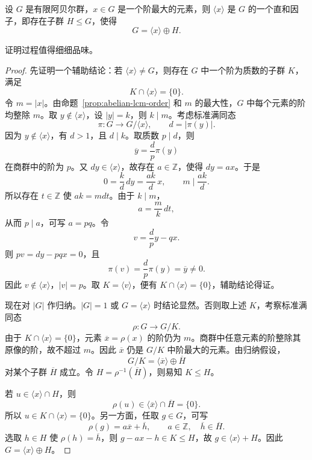 \begin{theorem}\label{thm:maximal-order-element-direct-summand}
设 $G$ 是有限阿贝尔群，$x\in G$ 是一个阶最大的元素，则 $\langle x\rangle$ 是 $G$ 的一个直和因子，即存在子群 $H\leq G$，使得
\[
  G=\langle x\rangle\oplus H.
\]
\end{theorem}

\begin{purplenote}
证明过程值得细细品味。
\end{purplenote}

\begin{proof}
先证明一个辅助结论：若 $\langle x\rangle\ne G$，则存在 $G$ 中一个阶为质数的子群 $K$，满足
\[
  K\cap\langle x\rangle=\{0\}.
\]
令 $m=|x|$。由命题~\ref{prop:abelian-lcm-order} 和 $m$ 的最大性，$G$ 中每个元素的阶均整除 $m$。取 $y\notin\langle x\rangle$，设 $|y|=k$，则 $k\mid m$。考虑标准满同态
\[
  \pi:G\longrightarrow G/\langle x\rangle,
  \qquad d=|\pi(y)|.
\]
因为 $y\notin\langle x\rangle$，有 $d>1$，且 $d\mid k$。取质数 $p\mid d$，则
\[
  \overline y=\frac{d}{p}\pi(y)
\]
在商群中的阶为 $p$。又 $dy\in\langle x\rangle$，故存在 $a\in\mathbb Z$，使得 $dy=ax$。于是
\[
  0=\frac{k}{d}\,dy=\frac{ak}{d}\,x,
  \qquad m\mid\frac{ak}{d}.
\]
所以存在 $t\in\mathbb Z$ 使 $ak=mdt$。由于 $k\mid m$，
\[
  a=\frac{m}{k}\,dt,
\]
从而 $p\mid a$，可写 $a=pq$。令
\[
  v=\frac{d}{p}y-qx.
\]
则 $pv=dy-pqx=0$，且
\[
  \pi(v)=\frac{d}{p}\pi(y)=\overline y\ne0.
\]
因此 $v\notin\langle x\rangle$，$|v|=p$。取 $K=\langle v\rangle$，便有 $K\cap\langle x\rangle=\{0\}$，辅助结论得证。

现在对 $|G|$ 作归纳。$|G|=1$ 或 $G=\langle x\rangle$ 时结论显然。否则取上述 $K$，考察标准满同态
\[
  \rho:G\longrightarrow G/K.
\]
由于 $K\cap\langle x\rangle=\{0\}$，元素 $\overline x=\rho(x)$ 的阶仍为 $m$。商群中任意元素的阶整除其原像的阶，故不超过 $m$。因此 $\overline x$ 仍是 $G/K$ 中阶最大的元素。由归纳假设，
\[
  G/K=\langle\overline x\rangle\oplus\overline H
\]
对某个子群 $\overline H$ 成立。令 $H=\rho^{-1}(\overline H)$，则易知 $K\leq H$。

若 $u\in\langle x\rangle\cap H$，则
\[
  \rho(u)\in\langle\overline x\rangle\cap\overline H=\{0\}.
\]
所以 $u\in K\cap\langle x\rangle=\{0\}$。另一方面，任取 $g\in G$，可写
\[
  \rho(g)=a\overline x+\overline h,
  \qquad a\in\mathbb Z,\quad\overline h\in\overline H.
\]
选取 $h\in H$ 使 $\rho(h)=\overline h$，则 $g-ax-h\in K\leq H$，故 $g\in\langle x\rangle+H$。因此 $G=\langle x\rangle\oplus H$。
\end{proof}

